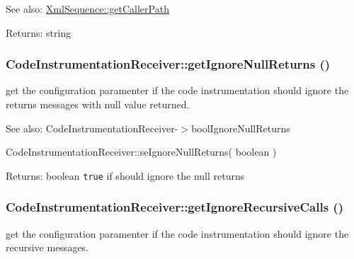 \begin{Desc}
\item[See also:]\hyperlink{class_xml_sequence_197ff62ed0c4d22324218206147f25e4}{XmlSequence::getCallerPath} \end{Desc}
\begin{Desc}
\item[Returns:]string \end{Desc}
\hypertarget{class_code_instrumentation_receiver_659ec50b656faab0ff518cce0cbe1a43}{
\subsubsection[{getIgnoreNullReturns}]{\setlength{\rightskip}{0pt plus 5cm}CodeInstrumentationReceiver::getIgnoreNullReturns ()}}
\label{class_code_instrumentation_receiver_659ec50b656faab0ff518cce0cbe1a43}


get the configuration paramenter if the code instrumentation should ignore the returns messages with null value returned.

\begin{Desc}
\item[See also:]CodeInstrumentationReceiver-$>$boolIgnoreNullReturns 

CodeInstrumentationReceiver::seIgnoreNullReturns( boolean ) \end{Desc}
\begin{Desc}
\item[Returns:]boolean {\tt true} if should ignore the null returns \end{Desc}
\hypertarget{class_code_instrumentation_receiver_f5d40f3016b4d1b289a089b24eebbbe5}{
\subsubsection[{getIgnoreRecursiveCalls}]{\setlength{\rightskip}{0pt plus 5cm}CodeInstrumentationReceiver::getIgnoreRecursiveCalls ()}}
\label{class_code_instrumentation_receiver_f5d40f3016b4d1b289a089b24eebbbe5}


get the configuration paramenter if the code instrumentation should ignore the recursive messages.

